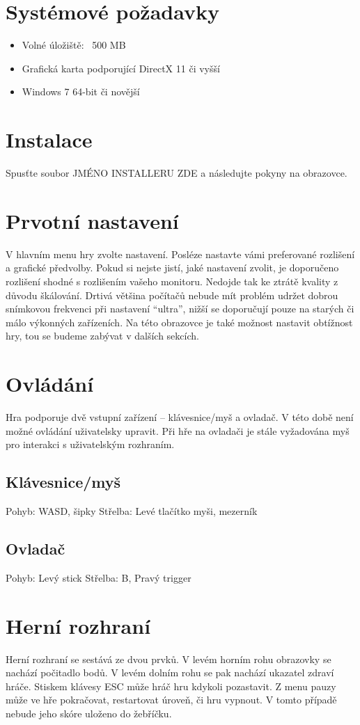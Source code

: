 \documentclass[12pt,a4paper,hidelinks]{article}
\begin{document}
\section{Systémové požadavky}
\begin{itemize}
	\item Volné úložiště: ~500 MB
	\item Grafická karta podporující DirectX 11 či vyšší
	\item Windows 7 64-bit či novější
\end{itemize}
\section{Instalace}
Spusťte soubor JMÉNO INSTALLERU ZDE a následujte pokyny na obrazovce.
\section{Prvotní nastavení}
V hlavním menu hry zvolte nastavení. Posléze nastavte vámi preferované rozlišení a grafické předvolby.
Pokud si nejste jistí, jaké nastavení zvolit, je doporučeno rozlišení shodné s rozlišením vašeho monitoru. Nedojde tak ke ztrátě kvality z důvodu škálování. Drtivá většina počítačů nebude mít problém udržet dobrou snímkovou frekvenci při nastavení \enquote{ultra}, nižší se doporučují pouze na starých či málo výkonných zařízeních.
Na této obrazovce je také možnost nastavit obtížnost hry, tou se budeme zabývat v dalších sekcích.
\section{Ovládání}
Hra podporuje dvě vstupní zařízení – klávesnice/myš a ovladač. V této době není možné ovládání uživatelsky upravit.
Při hře na ovladači je stále vyžadována myš pro interakci s uživatelským rozhraním.
\subsection{Klávesnice/myš}
Pohyb: WASD, šipky
Střelba: Levé tlačítko myši, mezerník
\subsection{Ovladač}
Pohyb: Levý stick
Střelba: B, Pravý trigger
\section{Herní rozhraní}
Herní rozhraní se sestává ze dvou prvků. V levém horním rohu obrazovky se nachází počitadlo bodů. V levém dolním rohu se pak nachází ukazatel zdraví hráče.
Stiskem klávesy ESC může hráč hru kdykoli pozastavit. Z menu pauzy může ve hře pokračovat, restartovat úroveň, či hru vypnout. V tomto případě nebude jeho skóre uloženo do žebříčku.
\end{document}
